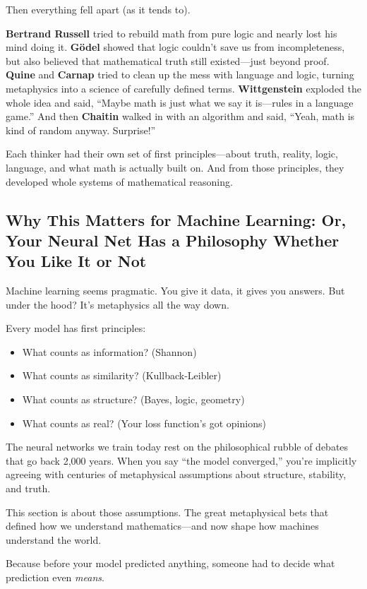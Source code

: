 Then everything fell apart (as it tends to).

\textbf{Bertrand Russell} tried to rebuild math from pure logic and nearly lost his mind doing it.  
\textbf{Gödel} showed that logic couldn’t save us from incompleteness, but also believed that mathematical truth still existed—just beyond proof.  
\textbf{Quine} and \textbf{Carnap} tried to clean up the mess with language and logic, turning metaphysics into a science of carefully defined terms.  
\textbf{Wittgenstein} exploded the whole idea and said, “Maybe math is just what we say it is—rules in a language game.”  
And then \textbf{Chaitin} walked in with an algorithm and said, “Yeah, math is kind of random anyway. Surprise!”

Each thinker had their own set of first principles—about truth, reality, logic, language, and what math is actually built on. And from those principles, they developed whole systems of mathematical reasoning.

\subsection{Why This Matters for Machine Learning: Or, Your Neural Net Has a Philosophy Whether You Like It or Not}

Machine learning seems pragmatic. You give it data, it gives you answers. But under the hood? It's metaphysics all the way down.

Every model has first principles:  
\begin{itemize}
    \item What counts as information? (Shannon)  
    \item What counts as similarity? (Kullback-Leibler)  
    \item What counts as structure? (Bayes, logic, geometry)  
    \item What counts as real? (Your loss function’s got opinions)
\end{itemize}

The neural networks we train today rest on the philosophical rubble of debates that go back 2,000 years. When you say “the model converged,” you’re implicitly agreeing with centuries of metaphysical assumptions about structure, stability, and truth.

This section is about those assumptions.  
The great metaphysical bets that defined how we understand mathematics—and now shape how machines understand the world.

Because before your model predicted anything, someone had to decide what prediction even \emph{means}.
